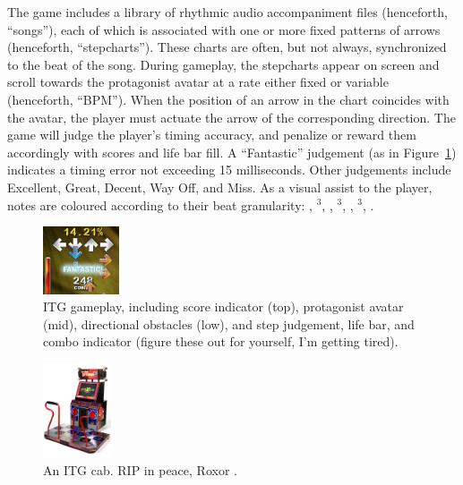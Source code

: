 \documentclass[10pt]{sigplanconf}
\begin{document}
The game includes a library of rhythmic audio accompaniment files (henceforth, ``songs''), each of which is associated with one or more fixed patterns of arrows (henceforth, ``stepcharts''). These charts are often, but not always, synchronized to the beat of the song.
During gameplay, the stepcharts appear on screen and scroll towards the protagonist avatar at a rate either fixed or variable (henceforth, ``BPM'').
When the position of an arrow in the chart coincides with the avatar, the player must actuate the arrow of the corresponding direction.
The game will judge the player's timing accuracy, and penalize or reward them accordingly with scores and life bar fill.
A ``Fantastic'' judgement (as in Figure~\ref{fig:protagonist}) indicates a timing error not exceeding 15 milliseconds.
Other judgements include Excellent, Great, Decent, Way Off, and Miss.
As a visual assist to the player, notes are coloured according to their beat granularity:
\color{red}\Vier\color{black},
\color{Purple}\Vier$^3$\color{black},
\color{blue}\Acht\color{black},
\color{Purple}\Acht$^3$\color{black},
\color{LimeGreen}\Sech\color{black},
\color{Magenta}\Sech$^3$\color{black},
\color{Dandelion}\Zwdr\color{black}.


\begin{figure}[t]
	\begin{center}
	\includegraphics[width=0.2\textwidth]{protagonist.png}
	\end{center}
	\caption{ITG gameplay, including score indicator (top), protagonist avatar (mid), directional obstacles (low), and step judgement, life bar, and combo indicator (figure these out for yourself, I'm getting tired).}
	\label{fig:protagonist}
\end{figure}
\begin{figure}[t]
	\begin{center}
	\includegraphics[width=0.18\textwidth]{itg2cabinet.jpg}
	\end{center}
	\caption{An ITG cab. RIP in peace, Roxor \cite{konami}.}
	\label{fig:cab}
\end{figure}
\end{document}
